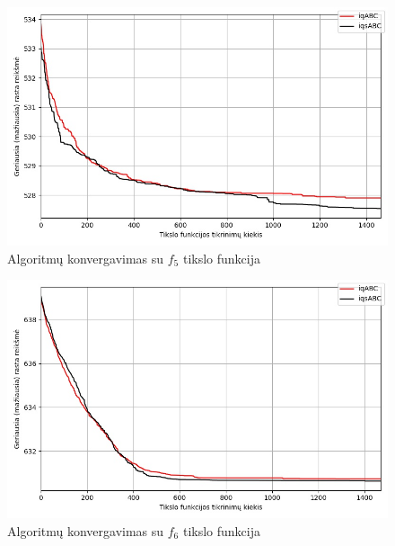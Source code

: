 \documentclass{VUMIFKompMagistrinis}
\begin{document}
\begin{landscape}
\begin{multicols}{2}
\begin{figure}[H]
    \centering
    \includegraphics[scale=0.5]{img/2kg/f5.jpg}
    \caption{Algoritmų konvergavimas su $f_{5}$ tikslo funkcija}
    \label{img:vkonf5}
\end{figure}

\begin{figure}[H]
    \centering
    \includegraphics[scale=0.5]{img/2kg/f6.jpg}
    \caption{Algoritmų konvergavimas su $f_{6}$ tikslo funkcija}
    \label{img:vkonf6}
\end{figure}





\end{multicols}\newpage
\begin{multicols}{2}



\end{multicols}
\end{landscape}
\end{document}
